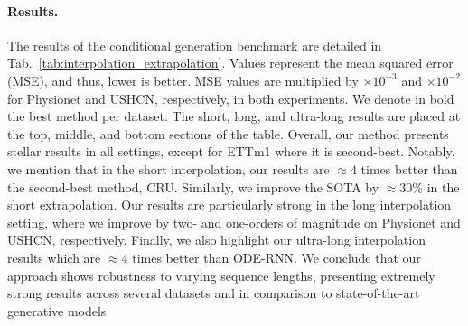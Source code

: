 \documentclass{article}
\begin{document}
\paragraph{Results.} The results of the conditional generation benchmark are detailed in Tab.~\ref{tab:interpolation_extrapolation}. Values represent the mean squared error (MSE), and thus, lower is better. MSE values are multiplied by $\times 10^{-3}$ and $\times 10^{-2}$ for Physionet and USHCN, respectively, in both experiments. We denote in bold the best method per dataset. The short, long, and ultra-long results are placed at the top, middle, and bottom sections of the table. Overall, our method presents stellar results in all settings, except for ETTm1 where it is second-best. Notably, we mention that in the short interpolation, our results are $\approx 4$ times better than the second-best method, CRU. Similarly, we improve the SOTA by $\approx 30\%$ in the short extrapolation. Our results are particularly strong in the long interpolation setting, where we improve by two- and one-orders of magnitude on Physionet and USHCN, respectively. Finally, we also highlight our ultra-long interpolation results which are $\approx 4$ times better than ODE-RNN. We conclude that our approach shows robustness to varying sequence lengths, presenting extremely strong results across several datasets and in comparison to state-of-the-art generative models.
\end{document}
